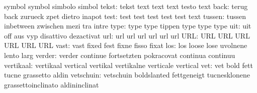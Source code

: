                            symbol                    symbol
                           simbolo                   simbol
                    tekst: tekst                     text
                           text                      text
                           testo                     text
                     back: terug                     back
                           zurueck                   zpet
                           dietro                    inapot
                     test: test                      test
                           test                      test
                           test                      text
                   tussen: tussen                    inbetween
                           zwischen                  mezi
                           tra                       intre
                     type: type                      type
                           tippen                    type
                           type                      type %
                      uit: uit                       off
                           aus                       vyp
                           disattivo                 dezactivat
                      url: url                       url
                           url                       url
                           url                       url
                      URL: URL                       URL
                           URL                       URL
                           URL                       URL
                     vast: vast                      fixed
                           fest                      fixne
                           fisso                     fixat
                      los: los                       loose
                           lose                      uvolnene
                           lento                     larg
                   verder: verder                    continue
                           fortsetzten               pokracovat
                           continua                  continuu
                vertikaal: vertikaal                 vertical
                           vertikal                  vertikalne
                           verticale                 vertical
                      vet: vet                       bold
                           fett                      tucne
                           grassetto                 aldin
                vetschuin: vetschuin                 boldslanted
                           fettgeneigt               tucnesklonene
                           grassettoinclinato        aldininclinat
